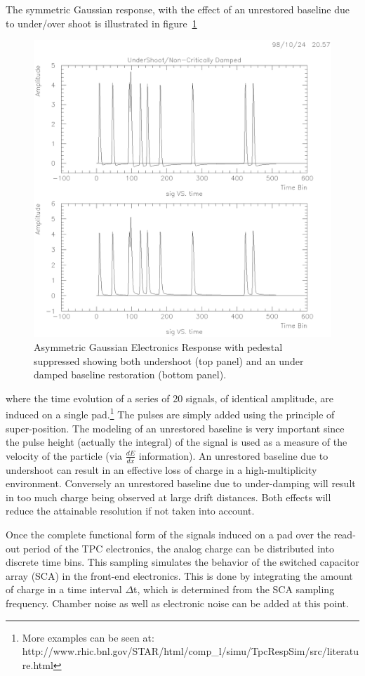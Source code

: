 \documentclass{article}
\begin{document}
The symmetric Gaussian response, with the effect of an unrestored baseline
due to under/over shoot is illustrated in figure~\ref{fig:baseline}
\begin{figure}[htb]
\begin{center}
\includegraphics[bbllx=14pt,bblly=137pt,bburx=569pt,bbury=701pt,width=.55\textwidth]{./pics/baseline.ps}
\caption{Asymmetric Gaussian Electronics Response with pedestal suppressed
  showing both undershoot (top panel) and an under damped
  baseline restoration (bottom panel).}
\label{fig:baseline}
\end{center}
\end{figure}
where the time evolution of a series of 20 signals, of identical
amplitude, are induced on a single pad.\footnote{More examples can
  be seen at: http://www.rhic.bnl.gov/STAR/html/comp\_l/simu/TpcRespSim/src/literature.html} 
The pulses are simply added using the principle of super-position.
The modeling of an unrestored baseline is very
important since the pulse height (actually the integral) of the
signal is used as a measure of the velocity of the particle
(via $\frac{dE}{dx}$ information).
An unrestored baseline due to undershoot can result in
an effective loss of charge in a high-multiplicity environment.  Conversely
an unrestored baseline due to under-damping will result in too much
charge being observed at large drift distances.  Both effects
will reduce the attainable resolution if not taken into account.  

Once the complete functional form of the signals induced on a pad
over the read-out period of the TPC electronics, the analog charge
can be distributed into discrete time bins. This sampling simulates
the behavior of the switched capacitor array (SCA) in the front-end
electronics.  This is done by integrating the amount of charge in
a time interval $\Delta$t, which is determined from the SCA sampling
frequency.  Chamber noise as well as electronic noise
can be added at this point.
\end{document}
